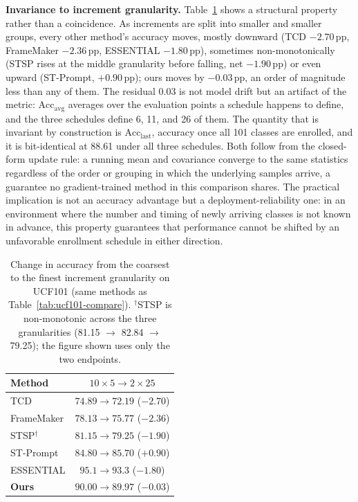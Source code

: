 \documentclass[a4paper,fleqn]{cas-dc}
\begin{document}
\textbf{Invariance to increment granularity.} Table~\ref{tab:invariance}
shows a structural property rather than a coincidence. As increments are
split into smaller and smaller groups, every other method's accuracy
moves, mostly downward (TCD $-2.70$\,pp, FrameMaker $-2.36$\,pp, ESSENTIAL
$-1.80$\,pp), sometimes non-monotonically (STSP rises at the middle
granularity before falling, net $-1.90$\,pp) or even upward (ST-Prompt,
$+0.90$\,pp); ours moves by $-0.03$\,pp, an order of magnitude less than
any of them. The residual 0.03 is not model drift but an artifact of the
metric: $\mathrm{Acc}_{\mathrm{avg}}$ averages over the evaluation points a
schedule happens to define, and the three schedules define 6, 11, and 26 of
them. The quantity that is invariant by construction is
$\mathrm{Acc}_{\mathrm{last}}$, accuracy once all 101 classes are enrolled,
and it is bit-identical at 88.61 under all three schedules. Both follow
from the closed-form update rule: a running mean and covariance converge to
the same statistics regardless of the order or grouping in which the
underlying samples arrive, a guarantee no gradient-trained method in this
comparison shares.
The practical implication is not an accuracy advantage but a
deployment-reliability one: in an environment where the number and timing
of newly arriving classes is not known in advance, this property
guarantees that performance cannot be shifted by an unfavorable enrollment
schedule in either direction.

\begin{table}[pos=!htb]
\centering
\caption{Change in accuracy from the coarsest to the finest increment
granularity on UCF101 (same methods as Table~\ref{tab:ucf101-compare}).
$^\dagger$STSP is non-monotonic across the three granularities
(81.15 $\to$ 82.84 $\to$ 79.25); the figure shown uses only the two
endpoints.}
\label{tab:invariance}
\small
\begin{tabular}{@{}lc@{}}
\toprule
Method & $10\times5 \to 2\times25$ \\
\midrule
TCD & $74.89 \to 72.19$ ($-2.70$) \\
FrameMaker & $78.13 \to 75.77$ ($-2.36$) \\
STSP$^\dagger$ & $81.15 \to 79.25$ ($-1.90$) \\
ST-Prompt & $84.80 \to 85.70$ ($+0.90$) \\
ESSENTIAL & $95.1 \to 93.3$ ($-1.80$) \\
\textbf{Ours} & $90.00 \to 89.97$ (\textbf{$-0.03$}) \\
\bottomrule
\end{tabular}
\end{table}
\end{document}
